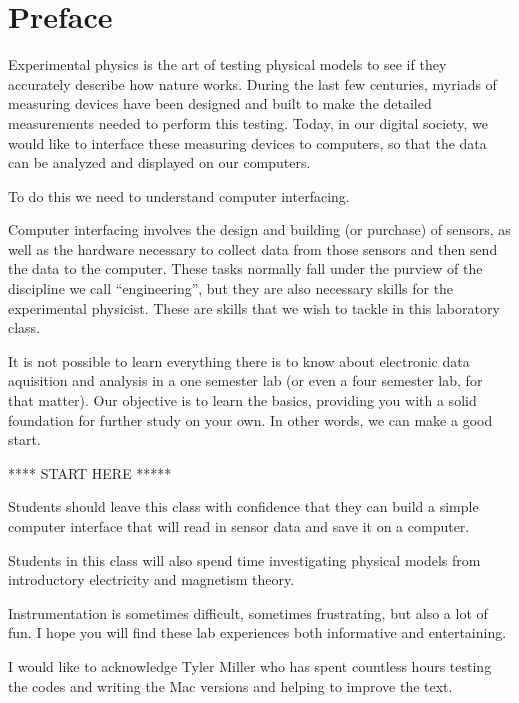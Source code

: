 \chapter*{Preface}

Experimental physics is the art of testing physical models to see if they 
accurately describe how nature works. During the last few centuries, myriads 
of measuring devices have been designed and built to make the detailed 
measurements needed to perform this testing. Today, in our digital society,
we would like to interface these measuring devices to computers, so that the 
data can be analyzed and displayed on our computers. 

To do this we need to understand computer interfacing.

Computer interfacing involves the design and building (or purchase) of sensors,
as well as the hardware necessary to collect data from those sensors and then
send the data to the computer. These tasks normally fall under the purview of
the discipline we call ``engineering'', but they are also necessary skills for
the experimental physicist. These are skills that we wish to tackle in this
laboratory class. 

It is not possible to learn everything there is to know about electronic data
aquisition and analysis in a one semester lab (or even a four semester lab, 
for that matter). Our objective is to learn the basics, providing you with
a solid foundation for further study on your own. In other words, we can make
a good start.

**** START HERE *****

Students should leave this class with confidence that they can build a simple computer interface that will read in sensor data and save it on a computer.

Students in this class will also spend time investigating physical models from introductory electricity and magnetism theory.

Instrumentation is sometimes difficult, sometimes frustrating, but also a lot of fun. I hope you will find these lab experiences both informative and entertaining. 

I would like to acknowledge Tyler Miller who has spent countless hours testing the codes and writing the Mac versions and helping to improve the text. 
